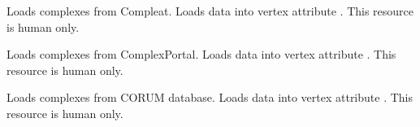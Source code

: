 \documentclass[letterpaper,10pt,english]{sphinxmanual}
\begin{document}
\begin{fulllineitems}
\begin{fulllineitems}
\label{\detokenize{main:pypath.main.PyPath.load_all_pathways}}
\end{fulllineitems}


\begin{fulllineitems}
\label{\detokenize{main:pypath.main.PyPath.load_compleat}}
Loads complexes from Compleat. Loads data into vertex attribute
.
This resource is human only.

\end{fulllineitems}


\begin{fulllineitems}
\label{\detokenize{main:pypath.main.PyPath.load_complexportal}}
Loads complexes from ComplexPortal. Loads data into vertex attribute
.
This resource is human only.

\end{fulllineitems}


\begin{fulllineitems}
\label{\detokenize{main:pypath.main.PyPath.load_comppi}}
\end{fulllineitems}


\begin{fulllineitems}
\label{\detokenize{main:pypath.main.PyPath.load_corum}}
Loads complexes from CORUM database. Loads data into vertex attribute
.
This resource is human only.

\end{fulllineitems}


\end{fulllineitems}
\end{document}
